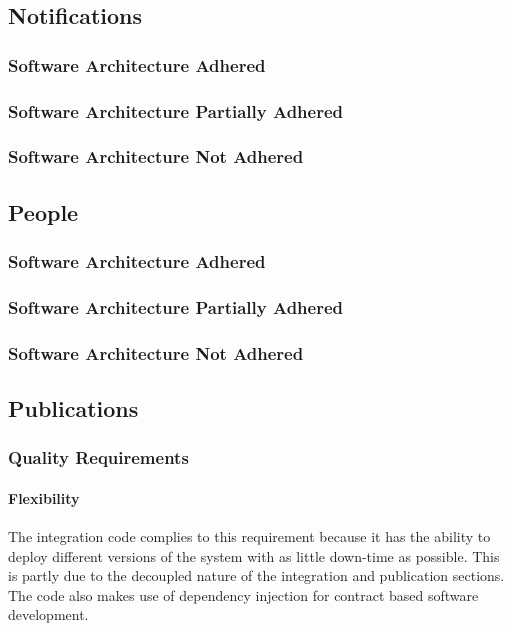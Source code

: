 \documentclass{article}
\begin{document}
    \subsection{Notifications}
        \subsubsection{Software Architecture Adhered}
        \subsubsection{Software Architecture Partially Adhered}
        \subsubsection{Software Architecture Not Adhered}       
        
    \subsection{People}
        \subsubsection{Software Architecture Adhered}
        \subsubsection{Software Architecture Partially Adhered}
        \subsubsection{Software Architecture Not Adhered}       
        
    \subsection{Publications}
    	\subsubsection{Quality Requirements}
    		\paragraph{Flexibility}
            The integration code complies to this requirement because it has the ability to deploy different versions of the system with as little down-time as possible. This is partly due to the decoupled nature of the integration and publication sections. The code also makes use of dependency injection for contract based software development.
    
\end{document}
